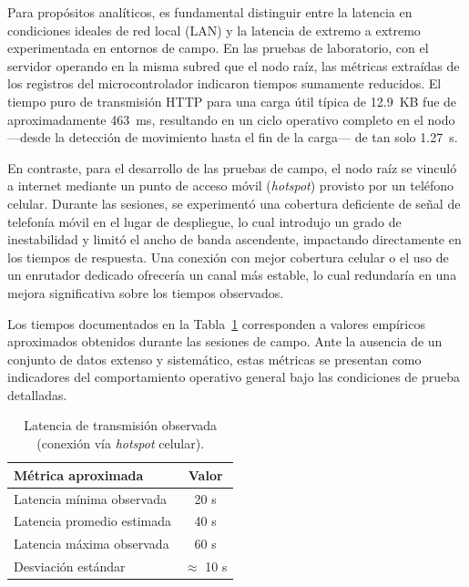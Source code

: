 \documentclass[a4paper, 12pt]{report}
\begin{document}
Para propósitos analíticos, es fundamental distinguir entre la latencia en condiciones ideales de red local (LAN) y la latencia de extremo a extremo experimentada en entornos de campo. En las pruebas de laboratorio, con el servidor operando en la misma subred que el nodo raíz, las métricas extraídas de los registros del microcontrolador indicaron tiempos sumamente reducidos. El tiempo puro de transmisión HTTP para una carga útil típica de \qty{12.9}{KB} fue de aproximadamente \qty{463}{ms}, resultando en un ciclo operativo completo en el nodo —desde la detección de movimiento hasta el fin de la carga— de tan solo \qty{1.27}{s}.

En contraste, para el desarrollo de las pruebas de campo, el nodo raíz se vinculó a internet mediante un punto de acceso móvil (\textit{hotspot}) provisto por un teléfono celular. Durante las sesiones, se experimentó una cobertura deficiente de señal de telefonía móvil en el lugar de despliegue, lo cual introdujo un grado de inestabilidad y limitó el ancho de banda ascendente, impactando directamente en los tiempos de respuesta. Una conexión con mejor cobertura celular o el uso de un enrutador dedicado ofrecería un canal más estable, lo cual redundaría en una mejora significativa sobre los tiempos observados.

Los tiempos documentados en la Tabla~\ref{tab:latencia} corresponden a valores empíricos aproximados obtenidos durante las sesiones de campo. Ante la ausencia de un conjunto de datos extenso y sistemático, estas métricas se presentan como indicadores del comportamiento operativo general bajo las condiciones de prueba detalladas.

\newpage
\begin{table}[htbp]
  \centering
  \caption{Latencia de transmisión observada (conexión vía \textit{hotspot} celular).}
  \label{tab:latencia}
  \begin{tabular}{lc}
    \hline
    \textbf{Métrica aproximada} & \textbf{Valor} \\
    \hline
    Latencia mínima observada   & 20 \unit{s}   \\
    Latencia promedio estimada  & 40 \unit{s}   \\
    Latencia máxima observada   & 60 \unit{s}   \\
    Desviación estándar         & $\approx$ 10 \unit{s}   \\
    \hline
  \end{tabular}
\end{table}
\end{document}
